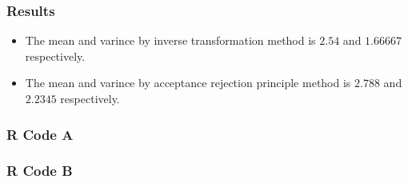 \documentclass[10pt]{article}
\begin{document}
\subsubsection{Results}
\begin{itemize}
\item The mean and varince by inverse transformation method is $2.54$ and $1.66667$ respectively.
\item The mean and varince by acceptance rejection principle method is $2.788$ and $2.2345$ respectively.
\end{itemize}

\subsubsection{R Code A}

	
\subsubsection{R Code B}

\end{document}
